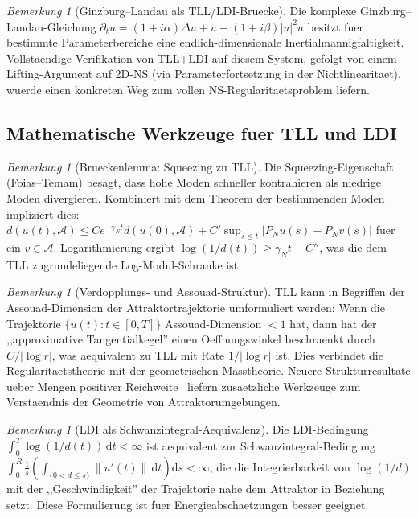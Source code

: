 \documentclass[12pt,a4paper]{article}
\theoremstyle{definition}
\theoremstyle{plain}
\theoremstyle{remark}
\newtheorem{remark}[definition]{Bemerkung}
\begin{document}
\begin{remark}[Ginzburg--Landau als TLL/LDI-Bruecke]
\label{rem:ginzburg-landau}
Die komplexe Ginzburg--Landau-Gleichung $\partial_t u = (1+i\alpha)\Delta u + u - (1+i\beta)|u|^2 u$ besitzt fuer bestimmte Parameterbereiche eine endlich-dimensionale Inertialmannigfaltigkeit. Vollstaendige Verifikation von TLL+LDI auf diesem System, gefolgt von einem Lifting-Argument auf 2D-NS (via Parameterfortsetzung in der Nichtlinearitaet), wuerde einen konkreten Weg zum vollen NS-Regularitaetsproblem liefern.
\end{remark}

\subsection{Mathematische Werkzeuge fuer TLL und LDI}

\begin{remark}[Brueckenlemma: Squeezing zu TLL]
\label{rem:bridge-squeezing}
Die Squeezing-Eigenschaft (Foias--Temam) besagt, dass hohe Moden schneller kontrahieren als niedrige Moden divergieren. Kombiniert mit dem Theorem der bestimmenden Moden impliziert dies: $d(u(t), \mathcal{A}) \leq C e^{-\gamma_N t} d(u(0), \mathcal{A}) + C' \sup_{s \leq t} |P_N u(s) - P_N v(s)|$ fuer ein $v \in \mathcal{A}$. Logarithmierung ergibt $\log(1/d(t)) \geq \gamma_N t - C''$, was die dem TLL zugrundeliegende Log-Modul-Schranke ist.
\end{remark}

\begin{remark}[Verdopplungs- und Assouad-Struktur]
\label{rem:doubling-assouad}
TLL kann in Begriffen der Assouad-Dimension der Attraktortrajektorie umformuliert werden: Wenn die Trajektorie $\{u(t) : t \in [0,T]\}$ Assouad-Dimension $< 1$ hat, dann hat der ,,approximative Tangentialkegel'' einen Oeffnungswinkel beschraenkt durch $C/|\log r|$, was aequivalent zu TLL mit Rate $1/|\log r|$ ist. Dies verbindet die Regularitaetstheorie mit der geometrischen Masstheorie. Neuere Strukturresultate ueber Mengen positiver Reichweite~\cite{Lytchak2024} liefern zusaetzliche Werkzeuge zum Verstaendnis der Geometrie von Attraktorumgebungen.
\end{remark}

\begin{remark}[LDI als Schwanzintegral-Aequivalenz]
\label{rem:ldi-tail}
Die LDI-Bedingung $\int_0^T \log(1/d(t))\,\mathrm{d}t < \infty$ ist aequivalent zur Schwanzintegral-Bedingung $\int_0^R \frac{1}{s} \left( \int_{\{0 < d \leq s\}} \|u'(t)\|\,\mathrm{d}t \right) \mathrm{d}s < \infty$, die die Integrierbarkeit von $\log(1/d)$ mit der ,,Geschwindigkeit'' der Trajektorie nahe dem Attraktor in Beziehung setzt. Diese Formulierung ist fuer Energieabschaetzungen besser geeignet.
\end{remark}
\end{document}
